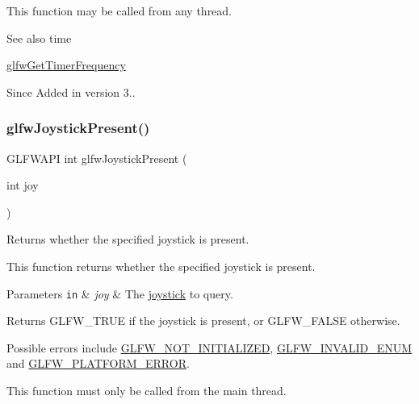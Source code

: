 This function may be called from any thread.

\begin{DoxySeeAlso}{See also}
time 

\hyperlink{group__input_gaa92d10b10013372778efbf6367714371}{glfw\+Get\+Timer\+Frequency}
\end{DoxySeeAlso}
\begin{DoxySince}{Since}
Added in version 3.. 
\end{DoxySince}
\mbox{\label{group__input_ga7f81f22f355f4b7d315caf73cdfd9906}} 
\subsubsection{\texorpdfstring{glfw\+Joystick\+Present()}{glfwJoystickPresent()}}
{\footnotesize\ttfamily G\+L\+F\+W\+A\+PI int glfw\+Joystick\+Present (\begin{DoxyParamCaption}\item[{int}]{joy }\end{DoxyParamCaption})}



Returns whether the specified joystick is present. 

This function returns whether the specified joystick is present.


\begin{DoxyParams}[1]{Parameters}
\mbox{\tt in}  & {\em joy} & The \hyperlink{group__joysticks}{joystick} to query. \\
\hline
\end{DoxyParams}
\begin{DoxyReturn}{Returns}
{\ttfamily G\+L\+F\+W\+\_\+\+T\+R\+UE} if the joystick is present, or {\ttfamily G\+L\+F\+W\+\_\+\+F\+A\+L\+SE} otherwise.
\end{DoxyReturn}
Possible errors include \hyperlink{group__errors_ga2374ee02c177f12e1fa76ff3ed15e14a}{G\+L\+F\+W\+\_\+\+N\+O\+T\+\_\+\+I\+N\+I\+T\+I\+A\+L\+I\+Z\+ED}, \hyperlink{group__errors_ga76f6bb9c4eea73db675f096b404593ce}{G\+L\+F\+W\+\_\+\+I\+N\+V\+A\+L\+I\+D\+\_\+\+E\+N\+UM} and \hyperlink{group__errors_gad44162d78100ea5e87cdd38426b8c7a1}{G\+L\+F\+W\+\_\+\+P\+L\+A\+T\+F\+O\+R\+M\+\_\+\+E\+R\+R\+OR}.

This function must only be called from the main thread.


